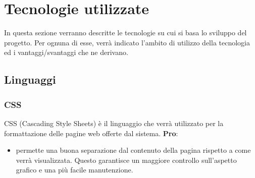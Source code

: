 %


\section{Tecnologie utilizzate} %
\label{sec:tecnologie_utilizzate}
In questa sezione verranno descritte le tecnologie su cui si basa lo sviluppo del progetto. Per ognuna di esse, verrà indicato l’ambito di utilizzo della tecnologia ed i vantaggi/svantaggi che ne derivano.

	\subsection{Linguaggi} %
	\label{sub:linguaggi}
		\subsubsection{CSS} %
		\label{ssub:css}
		CSS (Cascading Style Sheets) è il linguaggio che verrà utilizzato per la formattazione delle pagine web offerte dal sistema. \newline
		\textbf{Pro}:
			\begin{itemize}
				\item permette una buona separazione dal contenuto della pagina rispetto a come verrà visualizzata. Questo garantisce un maggiore controllo sull'aspetto grafico e una più facile manutenzione.
			\end{itemize}

